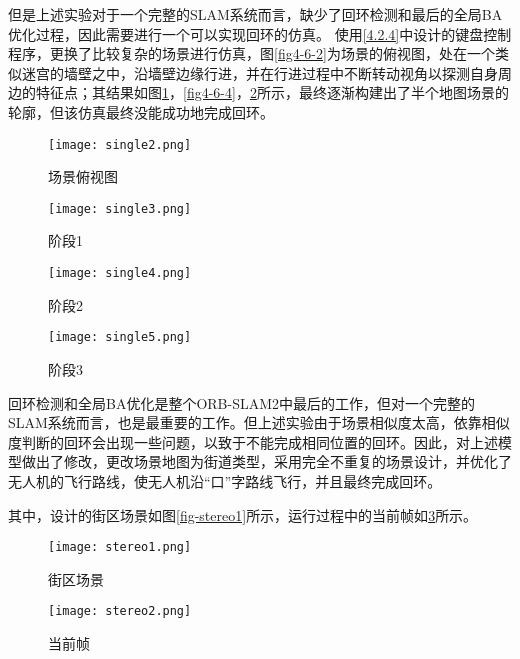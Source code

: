 但是上述实验对于一个完整的SLAM系统而言，缺少了回环检测和最后的全局BA优化过程，因此需要进行一个可以实现回环的仿真。
使用\ref{4.2.4}中设计的键盘控制程序，更换了比较复杂的场景进行仿真，图\ref{fig4-6-2}为场景的俯视图，处在一个类似迷宫的墙壁之中，沿墙壁边缘行进，并在行进过程中不断转动视角以探测自身周边的特征点；其结果如图\ref{fig4-6-3}，\ref{fig4-6-4}，\ref{fig4-6-5}所示，最终逐渐构建出了半个地图场景的轮廓，但该仿真最终没能成功地完成回环。

\begin{figure}[htbp]
	\centering
	\begin{minipage}[t]{0.45\columnwidth} %
		\centering
		\texttt{[image: single2.png]}
		\caption{场景俯视图}
		\label{fig4-6-2}
	\end{minipage}
	\begin{minipage}[t]{0.45\columnwidth}
		\centering
		\texttt{[image: single3.png]}
		\caption{阶段1}
		\label{fig4-6-3}
	\end{minipage}
\end{figure}

\begin{figure}[htbp]
	\centering
	\begin{minipage}[t]{0.45\columnwidth}
		\centering
		\texttt{[image: single4.png]}
		\caption{阶段2}
		\label{fig4-6-4}
	\end{minipage}
	\begin{minipage}[t]{0.45\columnwidth}
		\centering
		\texttt{[image: single5.png]}
		\caption{阶段3}
		\label{fig4-6-5}
	\end{minipage}
\end{figure}

回环检测和全局BA优化是整个ORB-SLAM2中最后的工作，但对一个完整的SLAM系统而言，也是最重要的工作。但上述实验由于场景相似度太高，依靠相似度判断的回环会出现一些问题，以致于不能完成相同位置的回环。因此，对上述模型做出了修改，更改场景地图为街道类型，采用完全不重复的场景设计，并优化了无人机的飞行路线，使无人机沿“口”字路线飞行，并且最终完成回环。

其中，设计的街区场景如图\ref{fig-stereo1}所示，运行过程中的当前帧如\ref{fig-stereo2}所示。

\begin{figure}[htbp]
	\centering
	\begin{minipage}[t]{0.45\columnwidth}
		\centering
		\texttt{[image: stereo1.png]}
		\caption{街区场景}
		\label{fig-stereo1}
	\end{minipage}
	\begin{minipage}[t]{0.45\columnwidth}
		\centering
		\texttt{[image: stereo2.png]}
		\caption{当前帧}
		\label{fig-stereo2}
	\end{minipage}
\end{figure}

